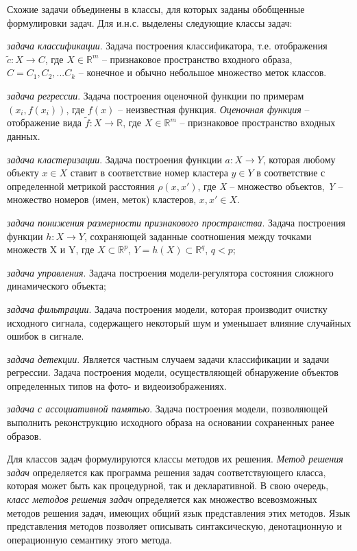 Схожие задачи объединены в классы, для которых заданы обобщенные формулировки задач. Для и.н.с. выделены следующие классы задач:
\begin{textitemize}
	\item \textit{задача классификации}. Задача построения классификатора, т.е. отображения $\tilde c: X \rightarrow C$, где $ X \in \mathbb{R}^m$ -- признаковое пространство входного образа, $C = {C_1, C_2, ...C_k }$ -- конечное и обычно небольшое множество меток классов.
	\item \textit{задача регрессии}. Задача построения оценочной функции по примерам $(x_i, f(x_i))$, где $f(x)$ -- неизвестная функция. \textit{Оценочная функция} -- отображение вида $\tilde{f}: X \rightarrow \mathbb{R}$, где $X \in \mathbb{R}^m$ -- признаковое пространство входных данных.
	\item \textit{задача кластеризации}. Задача построения функции $a: X \rightarrow Y$, которая любому объекту $x \in X$ ставит в соответствие номер кластера $y \in Y$ в соответствие с определенной метрикой расстояния $\rho(x, x')$, где \textit{X} -- множество объектов, \textit{Y} -- множество номеров (имен, меток) кластеров, $x, x' \in X$.
	\item \textit{задача понижения размерности признакового пространства}. Задача построения функции $h: X \rightarrow Y$, сохраняющей заданные соотношения между точками множеств X и Y, где $X \subset \mathbb{R}^p$, $Y=h(X) \subset \mathbb{R}^q$, $q < p$;
	\item \textit{задача управления}. Задача построения модели-регулятора состояния сложного динамического объекта;
	\item \textit{задача фильтрации}. Задача построения модели, которая производит очистку исходного сигнала, содержащего некоторый шум и уменьшает влияние случайных ошибок в сигнале.
	\item \textit{задача детекции}. Является частным случаем задачи классификации и задачи регрессии. Задача построения модели, осуществляющей обнаружение объектов определенных типов на фото- и видеоизображениях.
	\item \textit{задача с ассоциативной памятью}. Задача построения модели, позволяющей выполнить реконструкцию исходного образа на основании сохраненных ранее образов.
\end{textitemize}

Для классов задач формулируются классы методов их решения. \textit{Метод решения задач} определяется как программа решения задач соответствующего класса, которая может быть как процедурной, так и декларативной. В свою очередь, \textit{класс методов решения задач} определяется как множество всевозможных методов решения задач, имеющих общий язык представления этих методов. Язык представления методов позволяет описывать синтаксическую, денотационную и операционную семантику этого метода.

